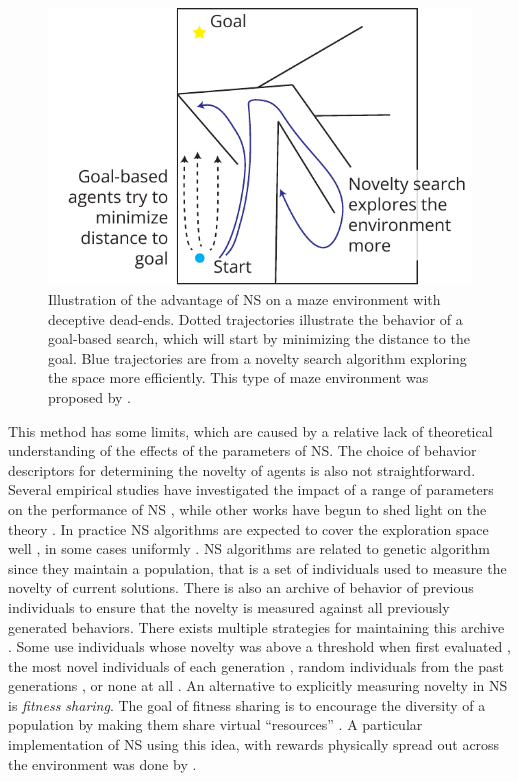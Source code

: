 \begin{figure}[htbp]
  \centering
  \includegraphics[width=.7\linewidth]{figures/novelty_search}
  \caption{Illustration of the advantage of \ac{NS} on a maze environment with
    deceptive dead-ends. Dotted trajectories illustrate the behavior of a
    goal-based search, which will start by minimizing the distance to the goal.
    Blue trajectories are from a novelty search algorithm exploring the space
    more efficiently. This type of maze environment was proposed by
    \textcite{lehmanAbandoningObjectivesEvolution2011}.}
\label{fig:novelty_search}
\end{figure}

This method has some limits, which are caused by a relative lack of theoretical
understanding of the effects of the parameters of \ac{NS}. The choice of
behavior descriptors for determining the novelty of agents is also not
straightforward. Several empirical studies have investigated the impact of a
range of parameters on the performance of \ac{NS}
\parencite{gomesDevisingEffectiveNovelty2015,
  kistemakerCriticalFactorsPerformance2011}, while other works have begun to
shed light on the theory \parencite{doncieuxNoveltySearchTheoretical2019}. In
practice \ac{NS} algorithms are expected to cover the exploration space well
\parencite{cullyQualityDiversityOptimization2017,pughQualityDiversityNew2016},
in some cases uniformly \parencite{gomesDevisingEffectiveNovelty2015}. \ac{NS}
algorithms are related to genetic algorithm since they maintain a population,
that is a set of individuals used to measure the novelty of current solutions.
There is also an archive of behavior of previous individuals to ensure that the
novelty is measured against all previously generated behaviors. There exists
multiple strategies for maintaining this archive
\parencite{gomesDevisingEffectiveNovelty2015}. Some use individuals whose
novelty was above a threshold when first evaluated
\parencite{lehmanAbandoningObjectivesEvolution2011}, the most novel individuals
of each generation \parencite{liapisConstrainedNoveltySearch2015}, random
individuals from the past generations
\parencite{lehmanEfficientlyEvolvingPrograms2010}, or none at all
\parencite{mouretEncouragingBehavioralDiversity2012}. An alternative to
explicitly measuring novelty in \ac{NS} is \emph{fitness sharing}. The goal of
fitness sharing is to encourage the diversity of a population by making them
share virtual ``resources'' \parencite{goldbergSimpleGeneticAlgorithms1987,
  hollandAdaptationNaturalArtificial1992}. A particular implementation of
\ac{NS} using this idea, with rewards physically spread out across the
environment was done by \textcite{herelEmergenceNoveltyEvolutionary2022}.

